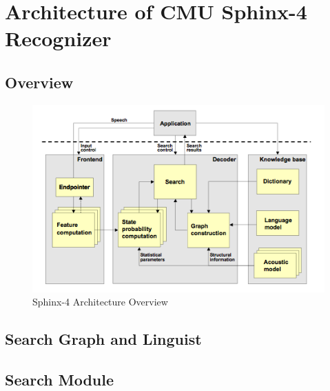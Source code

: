 \chapter{Architecture of CMU Sphinx-4 Recognizer}
\label{chap:sphinx}
 \section {Overview} 
  \begin{figure}[htbp]
  \centering
    \includegraphics[width=1.0\textwidth]{images/sphinxarch.png}
 \caption{Sphinx-4 Architecture Overview}
  \label{fig:Bild1}
\end {figure}
  \section {Search Graph and Linguist} 
  \section {Search Module} 